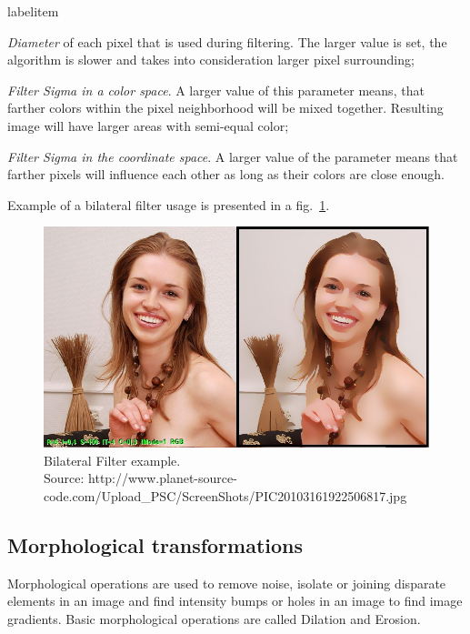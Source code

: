 \documentclass[a4paper,onecolumn,oneside,12pt]{memoir}
\makeatletter
\renewenvironment{itemize}{
  \begin{list}{  
  \csname labelitem\romannumeral\the\@listdepth\endcsname}{
  \setlength{\leftmargin}{1em}
	\setlength{\topsep}{6pt}%
	\setlength{\partopsep}{0pt}%
	\setlength{\parskip}{0pt}%
	\setlength{\parsep}{0pt}%
	\setlength{\itemsep}{0pt}}
}{
  \end{list}
}
\makeatother
\begin{document}
\begin{itemize}
  \item \textit{Diameter} of each pixel that is used during filtering. The larger value is set, the
        algorithm is slower and takes into consideration larger pixel surrounding;
  \item \textit{Filter Sigma in a color space}. A larger value of this parameter means, that farther
        colors within the pixel neighborhood will be mixed together. Resulting image will have
        larger areas with semi-equal color;
  \item \textit{Filter Sigma in the coordinate space}. A larger value of the parameter means that
        farther pixels will influence each other as long as their colors are close enough.
\end{itemize}

Example of a bilateral filter usage is presented in a fig.~\ref{bilateralFilterExample}.

\begin{figure}[ht]
\begin{center}
\includegraphics[scale=0.6]{images/BilateralFilterExample.jpg}
\caption{Bilateral Filter example. \\
Source: http://www.planet-source-code.com/Upload\_PSC/ScreenShots/PIC20103161922506817.jpg}
\label{bilateralFilterExample}
\end{center}
\end{figure}

\subsection{Morphological transformations}

Morphological operations are used to remove noise, isolate or joining disparate elements
in an image and find intensity bumps or holes in an image to find image gradients. Basic 
morphological operations are called Dilation and Erosion.
\end{document}
